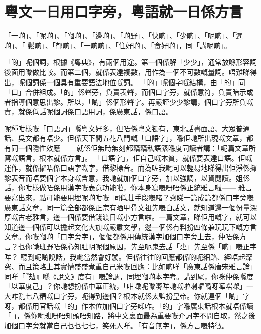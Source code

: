 \documentclass[a5paper, 10pt, openany]{book} %
\begin{document}




\chapter{粵文一日用口字旁，粵語就一日係方言}

「一啲」、「呢啲」、「嗰啲」、「邊啲」、「啲野」、「快啲」、「少啲」、「呢啲」、「遲啲」、「 鬆啲」、「郁啲」、「一啲啲」、「住好啲」、「食好啲」，同「講呢啲」。

「啲」呢個詞，根據《粵典》，有兩個用途。第一個係解「少少」，通常放喺形容詞後面用嚟做比較。而第二個，就係表達複數，用作為一個不可數嘅量詞。唔難睇得出，呢個詞係一個具有重要語法地位嘅詞。
「啲」呢個字嘅結構，由「的」同「口」合併組成。「的」係聲旁，負責表聲，而個口字旁，就係意符，負責暗示或者指導個意思出黎。所以，「啲」係個形聲字。再嚴謹少少黎講，個口字旁所負嘅責，就係低話呢個詞係口語用詞，係廣東話，係口語。

呢種咁樣嘅「口語詞」喺粵文好多，但唔係粵文獨有，東北話書面語、大眾普通話、吳文都有唔少。但係天下間五花八門嘅「口語字」，喺佢哋所出現嘅文章，都有同一個隱性效應—— 就係佢無時無刻都竊竊私語緊喺度同讀者講：「呢篇文章所寫嘅語言，根本就係方言」。
「口語字」，佢自己嘅本質，就係要表達口語。佢嘅運作，就係攞唔係口語字嘅字，借黎標音。而為咗我哋可以輕易地睇得出佢淨係攞黎表音而唔要個字本身嘅含意，我哋就加個口字旁，加以強調，以資閱讀。姐係話，你咁樣做唔係用漢字嘅表意功能啦，你本身寫嘅嘢唔係正統雅言啦—— 雅言要寫出來，點可能要用埋呢啲咁嘅同低莊手段嘅啫？齋睇一篇成篇都係口字旁嘅廣東話文章，同一篇全部都係正宗有晒甲骨文祖先嘅白話文，就知道邊一個份量深厚嘅古老雅言，邊一個係要借錢渡日嘅小方言啦。一篇文章，睇佢用嘅字，就可以知道邊一個係可以擔起文化大旗嘅嚴肅文學，邊一個係冇料扮四條兼玩玩下嘅方言文章。你嘅嗰啲「口字旁字」，個個都係用傳統漢字加個口字旁上去，仲唔係方言？乜你哋班野唔係心知肚明呢個原因，先至呃鬼去話「尐」先至係「啲」嘅正字咩？
聽到呢啲說話，我哋當然會好嬲。但係往往啲回應都係啲呃細路、經唔起深究、而且策略上其實懵盛盛煮重自己米嘅回應：比如啲咩「廣東話係唐宋雅言論」同咩「『攰』喺《說文》度有」嘅論調，同埋嗰啲本字考。講到尾，你咪仲係喺度「以華度己」？你哋想扮係中華正統，「咁噉呢嚟嘢咩哋嘅啦喇囉喎呀嘩啱㗎」一大咋亂七八糟嘅口字旁，呃得到邊個？根本就係太監扮皇帝。你就連個「啲」字呀，都係用官話嘅「的」作本位加個口字旁㗎咋。「的」字喺廣東話根本就唔係讀「󰦦」，係你哋班嘢唔知頭唔知路，將中文裏面最為重要嘅介詞字不問自取，然之後加個口字旁就當自己乜乜七七，笑死人咩。「有音無字」，係方言嘅特徵。
\end{document}
